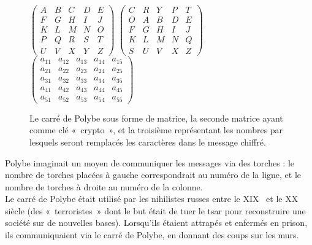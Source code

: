 \begin{figure}[h]
  $
  \left(
    \begin{array}{ccccc}
      A & B & C & D & E \\
      F & G & H & I & J \\
      K & L & M & N & O \\
      P & Q & R & S & T \\
      U & V & X & Y & Z
    \end{array}
  \right)
  $
  \hfill
  $
  \left(
    \begin{array}{ccccc}
      C & R & Y & P & T \\
      O & A & B & D & E \\
      F & G & H & I & J \\
      K & L & M & N & Q \\
      S & U & V & X & Z
    \end{array}
  \right)
  $
  \hfill
  $
  \left(
    \begin{array}{ccccc}
      a_{11} & a_{12} & a_{13} & a_{14} & a_{15}  \\
      a_{21} & a_{22} & a_{23} & a_{24} & a_{25}  \\
      a_{31} & a_{32} & a_{33} & a_{34} & a_{35}  \\
      a_{41} & a_{42} & a_{43} & a_{44} & a_{45}  \\
      a_{51} & a_{52} & a_{53} & a_{54} & a_{55}
    \end{array}
  \right)
  $
  \caption{Le carré de Polybe sous forme de matrice, la seconde
    matrice ayant comme clé «~crypto~», et la troisième représentant
    les nombres par lesquels seront remplacés les caractères dans le
    message chiffré.}
  \label{fig:Polybe}
\end{figure}

Polybe imaginait un moyen de communiquer les messages via des torches
: le nombre de torches placées à gauche correspondrait au numéro de la
ligne, et le nombre de torches à droite au numéro de la colonne. \\

Le carré de Polybe était utilisé par les nihilistes russes entre le
XIX\ieme~ et le XX\ieme~ siècle (des «~terroristes~» dont le but était de
tuer le tsar pour reconstruire une société sur de nouvelles
bases). Lorsqu'ils étaient attrapés et enfermés en prison, ils
communiquaient via le carré de Polybe, en donnant des coups sur les
murs. 

